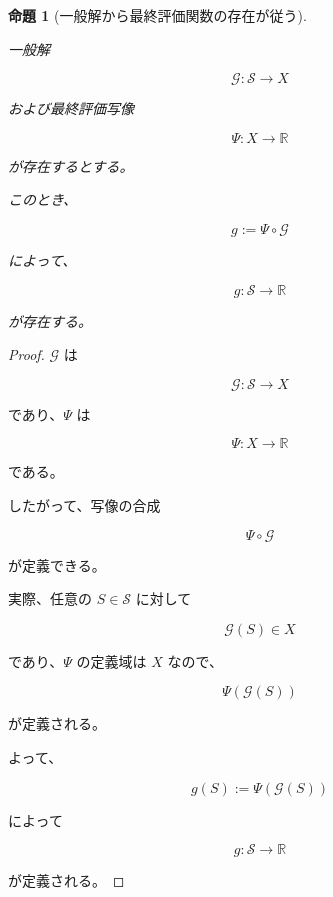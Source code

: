 \documentclass[a4paper,11pt]{article}
\newtheorem{proposition}[definition]{命題}
\newcommand{\Solver}{\mathcal{S}}
\newcommand{\R}{\mathbb{R}}
\begin{document}
\begin{proposition}[一般解から最終評価関数の存在が従う]
\label{prop:D-final-evaluation-existence}

一般解

\begin{equation}
    \mathcal{G}:
    \Solver\to X
\end{equation}

および最終評価写像

\begin{equation}
    \Psi:
    X\to\R
\end{equation}

が存在するとする。

このとき、

\begin{equation}
    g
    :=
    \Psi\circ\mathcal{G}
\end{equation}

によって、

\begin{equation}
    g:
    \Solver\to\R
\end{equation}

が存在する。
\end{proposition}

\begin{proof}

$\mathcal{G}$ は

\begin{equation}
    \mathcal{G}:\Solver\to X
\end{equation}

であり、$\Psi$ は

\begin{equation}
    \Psi:X\to\R
\end{equation}

である。

したがって、写像の合成

\begin{equation}
    \Psi\circ\mathcal{G}
\end{equation}

が定義できる。

実際、任意の $S\in\Solver$ に対して

\begin{equation}
    \mathcal{G}(S)\in X
\end{equation}

であり、$\Psi$ の定義域は $X$ なので、

\begin{equation}
    \Psi(\mathcal{G}(S))
\end{equation}

が定義される。

よって、

\begin{equation}
    g(S)
    :=
    \Psi(\mathcal{G}(S))
\end{equation}

によって

\begin{equation}
    g:\Solver\to\R
\end{equation}

が定義される。
\end{proof}
\end{document}
